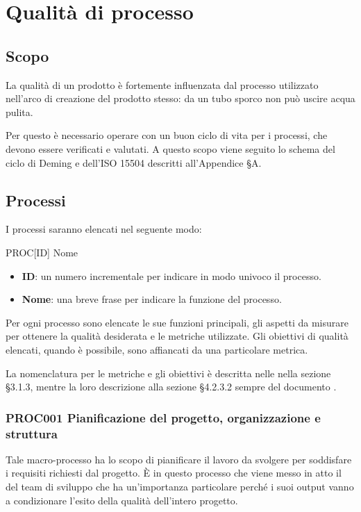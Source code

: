 \section{Qualità di processo}\label{QualitaProcesso}

\subsection{Scopo}
La qualità di un prodotto è fortemente influenzata dal processo utilizzato nell'arco di creazione del prodotto stesso: da un tubo sporco non può uscire acqua pulita.

Per questo è necessario operare con un buon ciclo di vita per i processi, che devono essere verificati e valutati. A questo scopo viene seguito lo schema del ciclo di Deming e dell'ISO 15504 descritti all'Appendice §A.

\subsection{Processi}
I processi saranno elencati nel seguente modo:

\begin{center}
	PROC[ID] Nome
\end{center}

\begin{itemize}
	\item \textbf{ID}: un numero incrementale per indicare in modo univoco il processo.
	\item \textbf{Nome}: una breve frase per indicare la funzione del processo.
\end{itemize}

Per ogni processo sono elencate le sue funzioni principali, gli aspetti da misurare per ottenere la qualità desiderata e le metriche utilizzate. Gli obiettivi di qualità elencati, quando è possibile, sono affiancati da una particolare metrica. 

La nomenclatura per le metriche e gli obiettivi è descritta nelle \NdPv nella sezione §3.1.3, mentre la loro descrizione alla sezione §4.2.3.2 sempre del documento \NdPv.

	\subsubsection{PROC001 Pianificazione del progetto, organizzazione e struttura}
	Tale macro-processo ha lo scopo di pianificare il lavoro da svolgere per soddisfare i requisiti richiesti dal progetto. È in questo processo che viene messo in atto il  del team di sviluppo che ha un'importanza particolare perché i suoi output vanno a condizionare l'esito della qualità dell'intero progetto.
	
